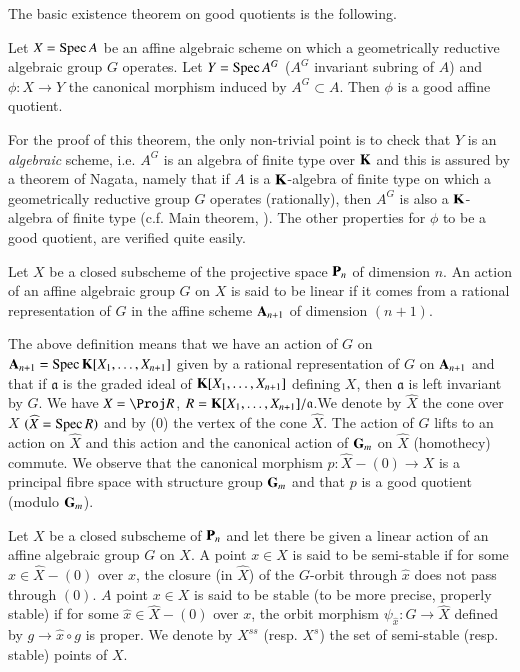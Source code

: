 The basic existence theorem on good quotients is the following.

\begin{theorem}\label{art18-thm2}
Let $X=\operatorname{\mathrm{Spec}} A$ be an affine algebraic scheme on which a geometrically reductive algebraic group $G$ operates. Let $Y=\operatorname{\mathrm{Spec}} A^{G}$ ($A^{G}$ invariant subring of $A$) and $\phi:X\to Y$ the canonical morphism induced by $A^{G}\subset A$. Then $\phi$ is a good affine quotient.
\end{theorem}

For the proof of this theorem, the only non-trivial point is to check that $Y$ is an {\em algebraic} scheme, i.e. $A^{G}$ is an algebra of finite type over $\mathbf{K}$ and this is assured by a theorem of Nagata, namely that if $A$ is a $\mathbf{K}$-algebra of finite type on which a geometrically reductive group $G$ operates (rationally), then $A^{G}$ is also a $\mathbf{K}$-algebra of finite type (c.f. Main theorem, \cite{art18-key6}). The other properties for $\phi$ to be a good quotient, are verified quite easily.

\begin{definition}\label{art18-defi5}
Let $X$ be a closed subscheme of the projective space $\mathbf{P}_{n}$ of dimension $n$. An action of an affine algebraic group $G$ on $X$ is said to be linear if it comes from a rational representation of $G$ in the affine scheme $\mathbf{A}_{n+1}$ of dimension $(n+1)$.
\end{definition}

The above definition means that we have an action of $G$ on $\mathbf{A}_{n+1}=\operatorname{\mathrm{Spec}} \mathbf{K}[X_{1},\ldots,X_{n+1}]$ given by a rational representation of $G$ on $\mathbf{A}_{n+1}$ and that if $\mathfrak{a}$ is the graded ideal of $\mathbf{K}[X_{1},\ldots,X_{n+1}]$ defining $X$, then $\mathfrak{a}$ is left invariant by $G$. We have $X=\Proj R$, $R=\mathbf{K}[X_{1},\ldots,X_{n+1}]/\mathfrak{a}$.\pageoriginale We denote by $\widehat{X}$ the cone over $X$ $(\widehat{X}=\operatorname{\mathrm{Spec}} R)$ and by (0) the vertex of the cone $\widehat{X}$. The action of $G$ lifts to an action on $\widehat{X}$ and this action and the canonical action of $\mathbf{G}_{m}$ on $\widehat{X}$ (homothecy) commute. We observe that the canonical morphism $p:\widehat{X}-(0)\to X$ is a principal fibre space with structure group $\mathbf{G}_{m}$ and that $p$ is a good quotient (modulo $\mathbf{G}_{m}$).

\begin{definition}\label{art18-defi6}
Let $X$ be a closed subscheme of $\mathbf{P}_{n}$ and let there be given a linear action of an affine algebraic group $G$ on $X$. A point $x\in X$ is said to be semi-stable if for some $\widehat{x}\in \widehat{X}-(0)$ over $x$, the closure (in $\widehat{X}$) of the $G$-orbit through $\widehat{x}$ does not pass through $(0)$. $A$ point $x\in X$ is said to be stable (to be more precise, properly stable) if for some $\widehat{x}\in \widehat{X}-(0)$ over $x$, the orbit morphism $\psi_{\widehat{x}}:G\to \widehat{X}$ defined by $g\to \widehat{x}\circ g$ is proper. We denote by $X^{ss}$ (resp. $X^{s}$) the set of semi-stable (resp. stable) points of $X$.
\end{definition}

